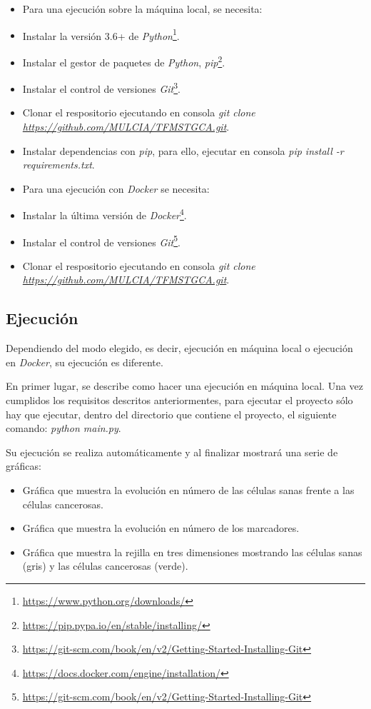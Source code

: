 \begin{itemize}
  \item Para una ejecución sobre la máquina local, se necesita:
        \item Instalar la versión 3.6+ de \textit{Python}\footnote{\url{https://www.python.org/downloads/}}.
        \item Instalar el gestor de paquetes de \textit{Python}, \textit{pip}\footnote{\url{https://pip.pypa.io/en/stable/installing/}}.
        \item Instalar el control de versiones \textit{Git}\footnote{\url{https://git-scm.com/book/en/v2/Getting-Started-Installing-Git}}.
        \item Clonar el respositorio ejecutando en consola \textit{git clone \url{https://github.com/MULCIA/TFMSTGCA.git}}.
        \item Instalar dependencias con \textit{pip}, para ello, ejecutar en consola \textit{pip install -r requirements.txt}.
  \item Para una ejecución con \textit{Docker} se necesita:
        \item Instalar la última versión de \textit{Docker}\footnote{\url{https://docs.docker.com/engine/installation/}}.
        \item Instalar el control de versiones \textit{Git}\footnote{\url{https://git-scm.com/book/en/v2/Getting-Started-Installing-Git}}.
        \item Clonar el respositorio ejecutando en consola \textit{git clone \url{https://github.com/MULCIA/TFMSTGCA.git}}.
\end{itemize}

\subsection{Ejecución}

Dependiendo del modo elegido, es decir, ejecución en máquina local o ejecución en \textit{Docker}, su ejecución es diferente.

En primer lugar, se describe como hacer una ejecución en máquina local. Una vez cumplidos los requisitos descritos anteriormentes,
para ejecutar el proyecto sólo hay que ejecutar, dentro del directorio que contiene el proyecto, el siguiente comando:
\textit{python main.py}.

Su ejecución se realiza automáticamente y al finalizar mostrará una serie de gráficas:

\begin{itemize}
  \item Gráfica que muestra la evolución en número de las células sanas frente a las células cancerosas.
  \item Gráfica que muestra la evolución en número de los marcadores.
  \item Gráfica que muestra la rejilla en tres dimensiones mostrando las células sanas (gris) y las células cancerosas (verde).
\end{itemize}

